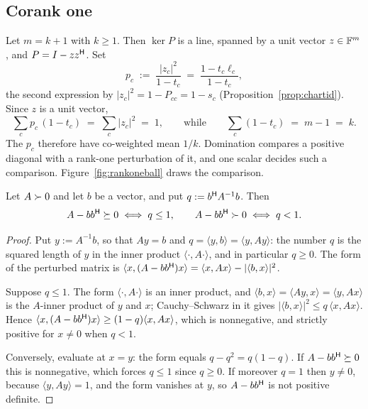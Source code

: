 \subsection{Corank one}\label{sec:corankone}

Let $m=k+1$ with $k\ge1$.  Then $\ker P$ is a line, spanned by a unit
vector $z\in\mathbb{F}^{m}$, and $P=I-zz^{\mathsf{H}}$.  Set
\begin{equation}\label{eq:pvars}
  p_c\;:=\;\frac{\lvert z_c\rvert^2}{1-t_c}
  \;=\;\frac{1-t_c\ell_c}{1-t_c},
\end{equation}
the second expression by $\lvert z_c\rvert^2=1-P_{cc}=1-s_c$
(Proposition~\ref{prop:chartid}).  Since $z$ is a unit vector,
\begin{equation}\label{eq:pnorm}
  \sum_c p_c\,(1-t_c)\;=\;\sum_c\lvert z_c\rvert^2\;=\;1,
  \qquad\text{while}\qquad
  \sum_c (1-t_c)\;=\;m-1\;=\;k .
\end{equation}
The $p_c$ therefore have co-weighted mean $1/k$.  Domination compares a
positive diagonal with a rank-one perturbation of it, and one scalar
decides such a comparison.  Figure~\ref{fig:rankoneball} draws the
comparison.

\begin{lemma}[Lean]\label{lem:rankone}
Let $A\succ0$ and let $b$ be a vector, and put $q:=b^{\mathsf{H}} A^{-1}b$.  Then
\[
  A-bb^{\mathsf{H}}\succeq0\iff q\le1,
  \qquad
  A-bb^{\mathsf{H}}\succ0\iff q<1 .
\]
\end{lemma}

\begin{proof}
Put $y:=A^{-1}b$, so that $Ay=b$ and
$q=\langle y,b\rangle=\langle y,Ay\rangle$: the number $q$ is the squared
length of $y$ in the inner product $\langle\cdot,A\cdot\rangle$, and in
particular $q\ge0$.  The form of the perturbed matrix is
$\langle x,(A-bb^{\mathsf{H}})x\rangle=\langle x,Ax\rangle-\lvert\langle
b,x\rangle\rvert^2$.

Suppose $q\le1$.  The form $\langle\cdot,A\cdot\rangle$ is an inner
product, and $\langle b,x\rangle=\langle Ay,x\rangle=\langle y,Ax\rangle$
is the $A$-inner product of $y$ and $x$; Cauchy--Schwarz in it gives
$\lvert\langle b,x\rangle\rvert^2\le q\,\langle x,Ax\rangle$.  Hence
$\langle x,(A-bb^{\mathsf{H}})x\rangle\ge(1-q)\langle x,Ax\rangle$, which is
nonnegative, and strictly positive for $x\ne0$ when $q<1$.

Conversely, evaluate at $x=y$: the form equals $q-q^2=q(1-q)$.  If
$A-bb^{\mathsf{H}}\succeq0$ this is nonnegative, which forces $q\le1$ since $q\ge0$.
If moreover $q=1$ then $y\ne0$, because $\langle y,Ay\rangle=1$, and the
form vanishes at $y$, so $A-bb^{\mathsf{H}}$ is not positive definite.
\end{proof}

